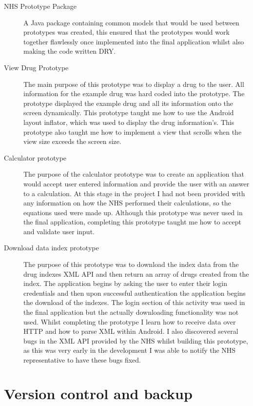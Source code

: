 \begin{description}
\item[NHS Prototype Package]
A Java \cite{java} package containing common models that would be used between prototypes was created, this ensured that the prototypes would work together flawlessly once implemented into the final application whilst also making the code written DRY.

\item[View Drug Prototype]
The main purpose of this prototype was to display a drug to the user. All information for the example drug was hard coded into the prototype. The prototype displayed the example drug and all its information onto the screen dynamically. This prototype taught me how to use the Android layout inflator, which was used to display the drug information's. This prototype also taught me how to implement a view that scrolls when the view size exceeds the screen size.

\item[Calculator prototype]
The purpose of the calculator prototype was to create an application that would accept user entered information and provide the user with an answer to a calculation. At this stage in the project I had not been provided with any information on how the NHS performed their calculations, so the equations used were made up. Although this prototype was never used in the final application, completing this prototype taught me how to accept and validate user input.

\item[Download data index prototype]
The purpose of this prototype was to download the index data from the drug indexes XML \cite{xml} API and then return an array of drugs created from the index. The application begins by asking the user to enter their login credentials and then upon successful authentication the application begins the download of the indexes. The login section of this activity was used in the final application but the actually downloading functionality was not used. Whilst completing the prototype I learn how to receive data over HTTP and how to parse XML within Android. I also discovered several bugs in the XML API provided by the NHS whilst building this prototype, as this was very early in the development I was able to notify the NHS representative to have these bugs fixed.
\end{description}

\section{Version control and backup}

